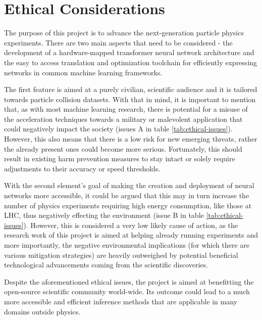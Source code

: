 \chapter{Ethical Considerations}

The purpose of this project is to advance the next-generation particle physics experiments. There are two main aspects
that need to be considered - the development of a hardware-mapped transformer neural network architecture and the easy
to access translation and optimization toolchain for efficiently expressing networks in common machine learning frameworks.  

The first feature is aimed at a purely civilian, scientific audience and it is tailored towards particle collision datasets.
With that in mind, it is important to mention that, as with most machine learning research, there is potential for a misuse
of the acceleration techniques towards a military or malevolent application that could negatively impact the society (issues
A in table \ref{tab:ethical-issues}). However, this also means that there is a low risk for new emerging threats, rather the
already present ones could become more serious. Fortunately, this should result in existing harm prevention measures to stay
intact or solely require adjustments to their accuracy or speed thresholds.

With the second element's goal of making the creation and deployment of neural networks more accessible, it could be argued
that this may in turn increase the number of physics experiments requiring high energy consumption, like those at
LHC\cite{RefWorks:RefID:1-cernfacts}, thus negatively effecting the environment (issue B in table \ref{tab:ethical-issues}).
However, this is considered a very low likely cause of action, as the research work of this project is aimed at helping
already running experiments and more importantly, the negative environmental implications (for which there are various mitigation
strategies\cite{Guida_2016, RefWorks:RefID:2-capeans2017strategies}) are heavily outweighed by potential beneficial technological
advancements coming from the scientific discoveries.

Despite the aforementioned ethical issues, the project is aimed at benefitting the open-source scientific community world-wide.
Its outcome could lead to a much more accessible and efficient inference methods that are applicable in many domains outside
physics.

